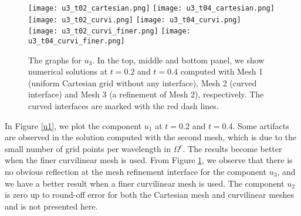 \begin{figure}[htbp]
	\centering
	\texttt{[image: u3\_t02\_cartesian.png]}
	\texttt{[image: u3\_t04\_cartesian.png]}\\
	\texttt{[image: u3\_t02\_curvi.png]}
	\texttt{[image: u3\_t04\_curvi.png]}\\
	\texttt{[image: u3\_t02\_curvi\_finer.png]}
	\texttt{[image: u3\_t04\_curvi\_finer.png]}
	\caption{The graphs for $u_3$. In the top, middle and bottom panel, we show numerical solutions at $t=0.2$ and $t=0.4$ computed with Mesh 1 (uniform Cartesian grid without any interface), Mesh 2 (curved interface) and Mesh 3 (a refinement of Mesh 2), respectively. The curved interfaces are marked with the red dash lines.}
\label{u3}
\end{figure}
In Figure \ref{u1}, we plot the component $u_1$ at $t=0.2$ and $t=0.4$.  Some artifacts are observed in the solution computed with the second mesh, which is due to the small number of grid points per wavelength in $\Omega^c$. The results become better when the finer curvilinear mesh is used. From Figure \ref{u3}, we observe that there is no obvious reflection at the mesh refinement interface for the component $u_3$, and we have a better result when a finer curvilinear mesh is used. The component $u_2$ is zero up to round-off error for both the Cartesian mesh and curvilinear meshes and is not presented here.